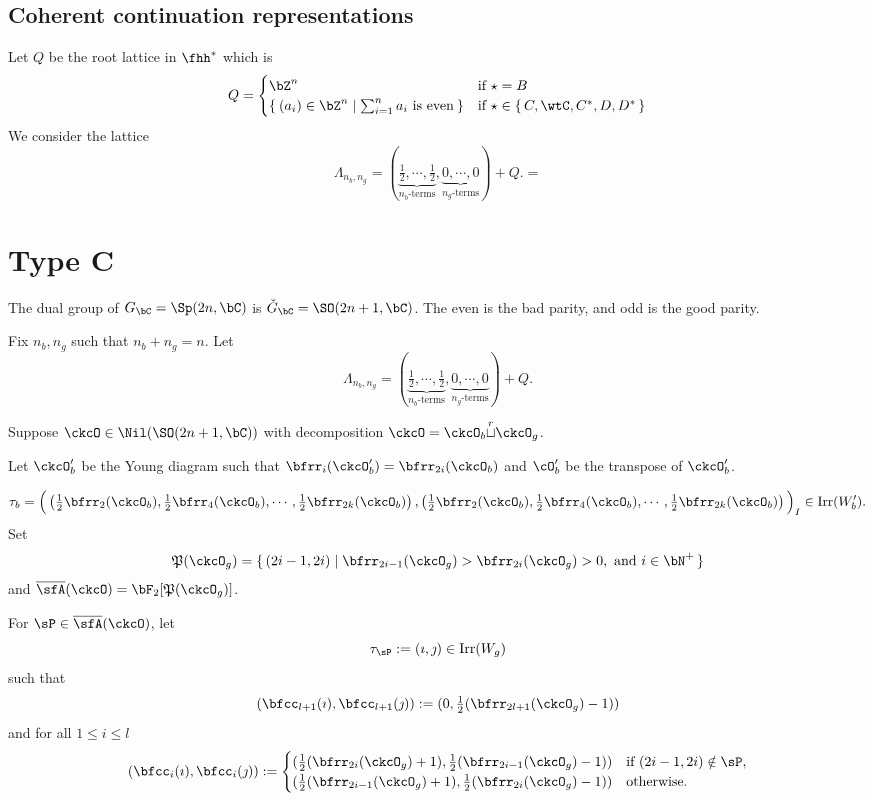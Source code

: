 \documentclass[12pt,a4paper]{amsart}
\newcommand{\CQ}{{\mathcal {Q}}}
\numberwithin{equation}{section}
\theoremstyle{remark}
\def\half{{\tfrac{1}{2}}}
\def\Irr{\mathrm{Irr}}
\def\ckGc{\check{G}_{\bC}}
\def\Gc{G_\bC}
\def\cuprow{{\stackrel{r}{\sqcup}}}
\def\CQ{\overline{\sfA}}%
\def\CPP{\mathfrak{P}}
\begin{document}
\subsection{Coherent continuation representations}

Let $Q$ be the root lattice in $\fhh^{*}$
which is
\[
Q = \begin{cases}
  \bZ^{n} & \text{if  $\star = B$}\\
  \Set{(a_{i})\in \bZ^{n}|\sum_{i=1}^{n}a_{i} \text{ is even}}
    & \text{if  $\star \in \set{C,\wtC,C^{*},D,D^{*}}$}\\
\end{cases}
\]
We consider the lattice
\[
  \Lambda_{n_{b},n_{g}} =
  (\underbrace{\half, \cdots, \half}_{n_{b}\text{-terms}}, \underbrace{0, \cdots, 0}_{n_{g}\text{-terms}}) + Q.
  =
\]

\section{Type C}

  The dual group of $\Gc = \Sp(2n,\bC)$ is $\ckGc = \SO(2n+1,\bC)$. The even is
  the bad parity, and odd is the good parity.


  Fix $n_{b},n_{g}$ such that $n_{b}+ n_{g} = n$. Let
  \begin{equation} \label{eq:Lam.C}
    \Lambda_{n_{b},n_{g}} = (\underbrace{\half, \cdots, \half}_{n_{b}\text{-terms}}, \underbrace{0, \cdots, 0}_{n_{g}\text{-terms}}) + Q.
  \end{equation}

  Suppose $\ckcO\in \Nil(\SO(2n+1,\bC))$ with decomposition
  $\ckcO = \ckcO_{b}\cuprow \ckcO_{g}$.

  Let $\ckcO'_b$ be the Young diagram such that
  $\bfrr_i(\ckcO'_b) = \bfrr_{2i}(\ckcO_b)$ and $\cO'_{b}$ be the transpose of
  $\ckcO'_{b}$.


  \[
    \tau_{b} = \Big( \left(\half\bfrr_{2}(\ckcO_{b}), \half\bfrr_{4}(\ckcO_{b}),\cdots, \half\bfrr_{2k}(\ckcO_{b})\right), \left(\half\bfrr_{2}(\ckcO_{b}), \half\bfrr_{4}(\ckcO_{b}),\cdots, \half\bfrr_{2k}(\ckcO_{b}) \right)\Big)_{I} \in \Irr(W'_{b}).
  \]
  Set
  \[
    \CPP(\ckcO_{g}) = \set{(2i-1,2i)| \bfrr_{2i-1}(\ckcO_{g})> \bfrr_{2i}(\ckcO_{g})>0, \text{
        and } i\in \bN^{+}}
  \]
  and $\CQ(\ckcO)= \bF_{2}[\CPP(\ckcO_{g})]$.

  For $\sP \in \CQ(\ckcO)$, let
  \[
    \tau_{\sP} := (\imath,\jmath) \in \Irr(W_{g})
  \]
  such that
  \[
    (\bfcc_{l+1}(\imath), \bfcc_{l+1}(\jmath)) := (0,\half(\bfrr_{2l+1}(\ckcO_{g})-1))
  \]
  and for all $1\leq i\leq l$
  \[
    (\bfcc_{i}(\imath), \bfcc_{i}(\jmath)):=
    \begin{cases}
      (\half (\bfrr_{2i}(\ckcO_{g})+1), \half (\bfrr_{2i-1}(\ckcO_{g})-1))
      & \text{if } (2i-1,2i)\notin \sP,\\
      (\half (\bfrr_{2i-1}(\ckcO_{g})+1),\half (\bfrr_{2i}(\ckcO_{g})-1)) & \text{otherwise.}
    \end{cases}
  \]
\end{document}
